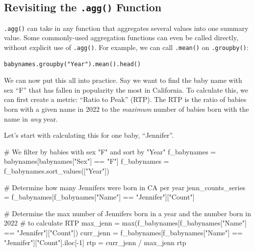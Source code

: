 \documentclass[
  letterpaper,
  DIV=11,
  numbers=noendperiod]{scrreprt}
\newenvironment{Shaded}{\begin{snugshade}}{\end{snugshade}}
\newcommand{\BuiltInTok}[1]{\textcolor[rgb]{0.00,0.23,0.31}{#1}}
\newcommand{\CommentTok}[1]{\textcolor[rgb]{0.37,0.37,0.37}{#1}}
\newcommand{\DecValTok}[1]{\textcolor[rgb]{0.68,0.00,0.00}{#1}}
\newcommand{\NormalTok}[1]{\textcolor[rgb]{0.00,0.23,0.31}{#1}}
\newcommand{\OperatorTok}[1]{\textcolor[rgb]{0.37,0.37,0.37}{#1}}
\newcommand{\StringTok}[1]{\textcolor[rgb]{0.13,0.47,0.30}{#1}}
\begin{document}
\hypertarget{revisiting-the-.agg-function}{%
\subsection{\texorpdfstring{Revisiting the \texttt{.agg()}
Function}{Revisiting the .agg() Function}}\label{revisiting-the-.agg-function}}

\texttt{.agg()} can take in any function that aggregates several values
into one summary value. Some commonly-used aggregation functions can
even be called directly, without explicit use of \texttt{.agg()}. For
example, we can call \texttt{.mean()} on \texttt{.groupby()}:

\begin{verbatim}
babynames.groupby("Year").mean().head()
\end{verbatim}

We can now put this all into practice. Say we want to find the baby name
with sex ``F'' that has fallen in popularity the most in California. To
calculate this, we can first create a metric: ``Ratio to Peak'' (RTP).
The RTP is the ratio of babies born with a given name in 2022 to the
\emph{maximum} number of babies born with the name in \emph{any} year.

Let's start with calculating this for one baby, ``Jennifer''.

\begin{Shaded}
\begin{Highlighting}[]
\CommentTok{\# We filter by babies with sex "F" and sort by "Year"}
\NormalTok{f\_babynames }\OperatorTok{=}\NormalTok{ babynames[babynames[}\StringTok{"Sex"}\NormalTok{] }\OperatorTok{==} \StringTok{"F"}\NormalTok{]}
\NormalTok{f\_babynames }\OperatorTok{=}\NormalTok{ f\_babynames.sort\_values([}\StringTok{"Year"}\NormalTok{])}

\CommentTok{\# Determine how many Jennifers were born in CA per year}
\NormalTok{jenn\_counts\_series }\OperatorTok{=}\NormalTok{ f\_babynames[f\_babynames[}\StringTok{"Name"}\NormalTok{] }\OperatorTok{==} \StringTok{"Jennifer"}\NormalTok{][}\StringTok{"Count"}\NormalTok{]}

\CommentTok{\# Determine the max number of Jennifers born in a year and the number born in 2022 }
\CommentTok{\# to calculate RTP}
\NormalTok{max\_jenn }\OperatorTok{=} \BuiltInTok{max}\NormalTok{(f\_babynames[f\_babynames[}\StringTok{"Name"}\NormalTok{] }\OperatorTok{==} \StringTok{"Jennifer"}\NormalTok{][}\StringTok{"Count"}\NormalTok{])}
\NormalTok{curr\_jenn }\OperatorTok{=}\NormalTok{ f\_babynames[f\_babynames[}\StringTok{"Name"}\NormalTok{] }\OperatorTok{==} \StringTok{"Jennifer"}\NormalTok{][}\StringTok{"Count"}\NormalTok{].iloc[}\OperatorTok{{-}}\DecValTok{1}\NormalTok{]}
\NormalTok{rtp }\OperatorTok{=}\NormalTok{ curr\_jenn }\OperatorTok{/}\NormalTok{ max\_jenn}
\NormalTok{rtp}
\end{Highlighting}
\end{Shaded}
\end{document}
